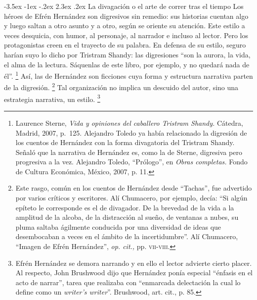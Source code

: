 \documentclass[14pt,twoside,final]{extbook} %
\makeatletter
\let\oldfootnote\footnote
\renewcommand\footnote[1]{%
\oldfootnote{\hspace{1mm}#1}}
\renewcommand\section{\@startsection {section}{1}{\z@}%
                                     {-3.5ex \@plus -1ex \@minus -.2ex}%
                                     {2.3ex \@plus .2ex}%
                                     {\normalfont\large\bfseries\sc}}
\makeatother
\begin{document}
\section{La divagación o el arte de correr tras el tiempo}\label{sec:la-divagacion-o-el-arte-de-correr-tras-el-tiempo}
Los héroes de Efrén Hernández son digresivos sin remedio: sus historias cuentan algo y luego saltan a otro asunto y a otro, según se oriente su atención. Este estilo a veces desquicia, con humor, al personaje, al narrador e incluso al lector. Pero los protagonistas creen en el trayecto de su palabra. En defensa de su estilo, seguro harían suyo lo dicho por Tristram Shandy: las digresiones ``son la aurora, la vida, el alma de la lectura. Sáquenlas de este libro, por ejemplo, y no quedará nada de él''.\footnote{Laurence Sterne, \emph{Vida y opiniones del caballero Tristram Shandy.} Cátedra, Madrid, 2007, p.~125. Alejandro Toledo ya había relacionado la digresión de los cuentos de Hernández con la forma divagatoria del Tristram Shandy. Señaló que la narrativa de Hernández es, como la de Sterne, digresiva pero progresiva a la vez.  Alejandro Toledo, ``Prólogo'', en \emph{Obras completas.} Fondo de Cultura Económica, México, 2007, p. 11.} Así, las de Hernández son ficciones cuya forma y estructura narrativa parten de la digresión.\footnote{Este rasgo, común en los cuentos de Hernández desde ``Tachas'', fue advertido por varios críticos y escritores. Alí Chumacero, por ejemplo, decía: ``Si algún epíteto le corresponde es el de divagador. De la brevedad de la vida a la amplitud de la alcoba, de la distracción al sueño, de ventanas a nubes, su pluma saltaba ágilmente conducida por una diversidad de ideas que desembocaban a veces en el ámbito de la incertidumbre”. Alí Chumacero, ``Imagen de Efrén Hernández'', \emph{op. cit.,} pp. \textsc{vii-viii}.} Tal organización no implica un descuido del autor, sino una estrategia narrativa, un estilo.\footnote{Efrén Hernández se demora narrando y en ello el lector advierte cierto placer. Al respecto, John Brushwood dijo que Hernández ponía especial ``énfasis en el acto de narrar'', tarea que realizaba con ``enmarcada delectación la cual lo define como un \emph{writer’s writer}''. Brushwood, art. cit., p. 85.}
\end{document}
